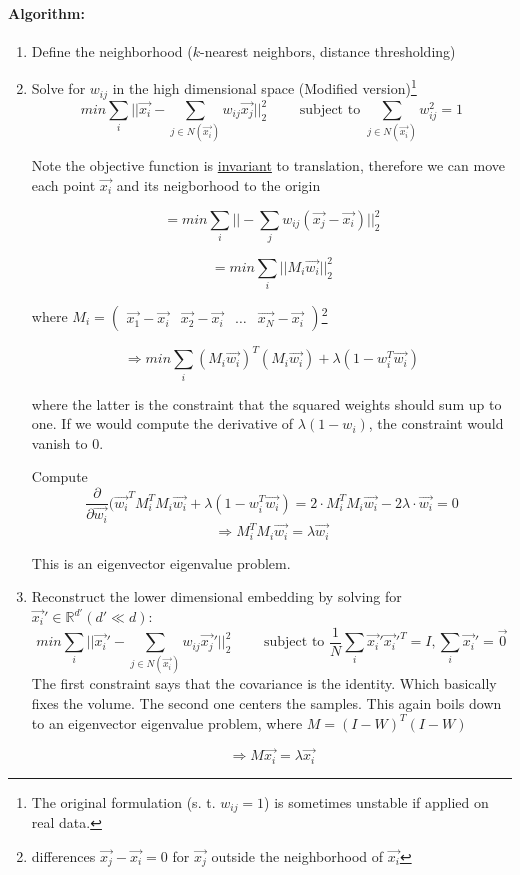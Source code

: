 \paragraph{Algorithm:}
\begin{enumerate}
    \item Define the neighborhood (\(k\)-nearest neighbors, distance thresholding)

    \item Solve for \(w_{ij}\) in the high dimensional space (Modified version)\footnote{The original formulation (s. t. $ w_{ij} = 1$) is sometimes unstable if applied on real data.}
        \[min \sum_{i}||\vec{x_i} - \sum_{j\in N(\vec{x_i})} w_{ij} \vec{x_j}||_2^2 \qquad \text{ subject to } \sum_{j \in N(\vec{x_i})} w_{ij}^2 = 1\]


        Note the objective function is \underline{invariant} to translation, therefore we can move each point $\vec{x_i}$ and its neigborhood to the origin

        \begin{equation*}
            = min \sum_{i} ||- \sum_j w_{ij} (\vec{x_j} - \vec{x_i})||_2^2
        \end{equation*}

        \begin{equation*}
          = min \sum_{i} ||M_i\vec{w_i}||_2^2
        \end{equation*}

        where $M_i = \left(\begin{array}{cccc} \vec{x_1} - \vec{x_i} & \vec{x_2} - \vec{x_i}& \dots& \vec{x_N} - \vec{x_i} \end{array}\right)$\footnote{differences \(\vec{x_j} - \vec{x_i} = 0\) for \(\vec{x_j}\) outside the neighborhood of \(\vec{x_i}\)}

        \[\Rightarrow min \sum_{i} (M_i \vec{w_i})^T (M_i \vec{w_i}) + \lambda(1-w_i^T \vec{w_i})\]

        where the latter is the constraint that the squared weights should sum up to one. If we would compute the derivative of \(\lambda(1-w_i)\), the constraint would vanish to \(0\).

        Compute
        \[\frac{\partial}{\partial \vec{w_i}} (\vec{w_i}^T M_i^T M_i \vec{w_i} + \lambda(1-w_i^T \vec{w_i})=  2 \cdot M_i^T M_i \vec{w_i} - 2 \lambda  \cdot \vec{w_i} = 0\]
        \[\Rightarrow \boxed{M_i^T M_i \vec{w_i} = \lambda \vec{w_i}}\]

        This is an eigenvector eigenvalue problem.

    \item Reconstruct the lower dimensional embedding by solving for \(\vec{x_i}' \in \mathbb{R}^{d'} (d' \ll d)\):
        \[min \sum_i ||\vec{x_i}' - \sum_{j \in N(\vec{x_i})} w_{ij} \vec{x_j}'||_2^2 \qquad \text{ subject to } \frac{1}{N} \sum_i \vec{x_i}' \vec{x_i}'^T = I, \sum_i \vec{x_i}' = \vec{0}\]
        The first constraint says that the covariance is the identity. Which basically fixes the volume. The second one centers the samples. This again boils down to an eigenvector eigenvalue problem, where $M = (I - W)^T (I - W)$

          \[\Rightarrow \boxed{M \vec{x_i} = \lambda \vec{x_i}}\]
\end{enumerate}
